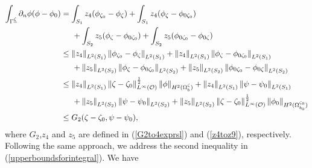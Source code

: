 \documentclass[11pt]{article}
\begin{document}
\begin{equation*}
	\begin{split}
		\displaystyle\int_{\Gamma^{\underline{\zeta}}} \partial_n\phi(\phi-\phi_0)&=\displaystyle\int_{S_1}z_4(\phi_{\zeta_0}-\phi_{\zeta})+\displaystyle\int_{S_1}z_4(\phi_{\zeta}-\phi_{0\zeta_0})\\
		&\hspace{0.5cm}+\displaystyle\int_{S_2}z_5(\phi_{\zeta}-\phi_{0\zeta_0})+\displaystyle\int_{S_2}z_5(\phi_{0\zeta_0}-\phi_{0\zeta})\\
		&\leq \left\Vert  z_4 \right\Vert_{L^2(S_1)}\left\Vert   \phi_{\zeta_0}-\phi_{\zeta} \right\Vert_{L^2(S_1)}+ \left\Vert   z_4\right\Vert_{L^2(S_1)}  \left\Vert \phi_{\zeta}-\phi_{0\zeta_0}  \right\Vert_{L^2(S_1)}\\
		&\hspace{0.5cm}+ \left\Vert  z_5 \right\Vert_{L^2(S_2)}\left\Vert   \phi_{\zeta}-\phi_{0\zeta_0} \right\Vert_{L^2(S_2)}+ \left\Vert   z_5\right\Vert_{L^2(S_2)}  \left\Vert \phi_{0\zeta_0}-\phi_{0\zeta}  \right\Vert_{L^2(S_2)}\\
		&\leq \left\Vert z_4 \right\Vert_{L^2(S_1)}\left\Vert   \zeta-\zeta_0 \right\Vert_{L^{\infty}(\mathcal O )}^{\frac{1}{2}}\left\Vert\phi\right\Vert_{H^2(\Omega_b^{\zeta})}+ \left\Vert   z_4\right\Vert_{L^2(S_1)}  \left\Vert \psi-\psi_0 \right\Vert_{L^2(S_1)}\\
		&\hspace{0.5cm}+ \left\Vert  z_5 \right\Vert_{L^2(S_2)}\left\Vert   \psi-\psi_0 \right\Vert_{L^2(S_2)}+ \left\Vert   z_5\right\Vert_{L^2(S_2)}  \left\Vert \zeta-\zeta_0  \right\Vert_{L^{\infty}(\mathcal O )}^{\frac{1}{2}}\left\Vert\phi_0\right\Vert_{H^2(\Omega_{b_0}^{\zeta_0})}\\
		&\leq G_2(\zeta-\zeta_0,\psi-\psi_0),
	\end{split}
\end{equation*}
where $G_2$,$z_4$ and $z_5$ are defined in (\ref{G2to4exprsl}) and (\ref{z4toz9}), respectively.\\
Following the same approach, we address the second inequality in (\ref{upperboundsforintegral}). We have
\end{document}

